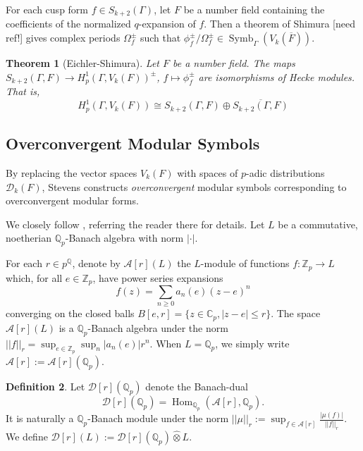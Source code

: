 \documentclass[10pt]{amsart}
\theoremstyle{plain}
\newtheorem{theorem}{Theorem}[section]
\theoremstyle{definition}
\newtheorem{definition}[theorem]{Definition}
\newcommand{\ZZ}{{\mathbb{Z}}}
\newcommand{\CC}{{\mathbb{C}}}
\newcommand{\QQ}{{\mathbb{Q}}}
\newcommand{\cA}{\mathcal{A}}
\newcommand{\cD}{\mathcal{D}}
\DeclareMathOperator{\Hom}{Hom}
\DeclareMathOperator{\Symb}{Symb}
\begin{document}
For each cusp form $f\in S_{k+2}(\Gamma)$, let $F$ be a number field containing the coefficients of the normalized $q$-expansion of $f$. Then a theorem of Shimura [need ref!] gives complex periods $\Omega_f^\pm$ such that $\phi_f^\pm/\Omega_f^\pm \in \Symb_\Gamma(V_k(\overline{F}))$. 
\begin{theorem}[Eichler-Shimura]
Let $F$ be a number field. The maps $S_{k+2}(\Gamma,F)\longrightarrow H^1_p(\Gamma, V_k(F))^\pm$, $f\mapsto \phi_{f}^\pm$ are isomorphisms of Hecke modules. That is,
\begin{equation*}
	H^1_p(\Gamma, V_k(F)) \cong S_{k+2}(\Gamma,F)\oplus \overline{S_{k+2}(\Gamma,F)}
\end{equation*}
\end{theorem}

\subsection{Overconvergent Modular Symbols}
By replacing the vector spaces $V_k(F)$ with spaces of $p$-adic distributions $\cD_k(F)$, Stevens \cite{Stevens} constructs \emph{overconvergent} modular symbols corresponding to  overconvergent modular forms.

We closely follow \cite{Bellaiche}, referring the reader there for details. Let $L$ be a commutative, noetherian $\QQ_p$-Banach algebra with norm $|\cdot |$. 

For each $r\in p^\QQ$, denote by $\cA[r](L)$ the $L$-module of functions $f:\ZZ_p\rightarrow L$ which, for all $e\in\ZZ_p$,  have power series expansions 
\begin{equation*}
	f(z) = \sum_{n \geq 0 } a_n(e) (z-e)^n
\end{equation*}
converging on the closed balls $B[e,r] = \{z \in \CC_p, |z-e| \leq r\}$. The space $\cA[r](L)$ is a $\QQ_p$-Banach algebra under the norm $||f ||_r = \sup_{e\in\ZZ_p} \sup_n |a_n(e)|r^n$. When $L=\QQ_p$, we simply write $\cA[r]:=\cA[r](\QQ_p)$.



\begin{definition}
Let $\cD[r](\QQ_p)$ denote the Banach-dual
\begin{equation}
	\cD[r](\QQ_p) = \Hom_{\QQ_p}(\cA[r],\QQ_p).
\end{equation}
It is naturally a $\QQ_p$-Banach module under the norm $||\mu||_r := \sup_{f\in \cA[r]} \frac{ |\mu(f)|}{||f||_r}$. We define $\cD[r](L) :=\cD[r](\QQ_p) \widehat{\otimes} L$.
\end{definition}
\end{document}
